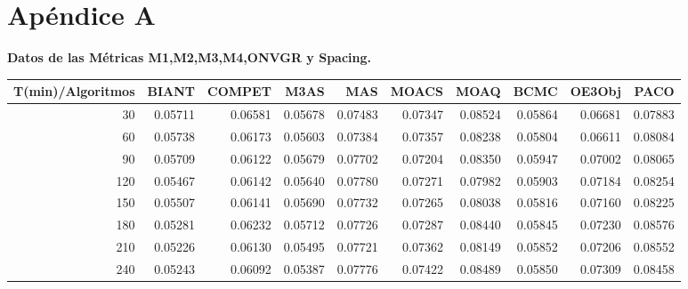 \chapter{Apéndice A}

\textbf{Datos de las M\'etricas M1,M2,M3,M4,ONVGR y Spacing.}
\ifpdf
\graphicspath{{Appendix1/Appendix1Figs/PNG/}{Appendix1/Appendix1Figs/PDF/}{Appendix1/Appendix1Figs/}}
\else
\graphicspath{{Appendix1/Appendix1Figs/EPS/}{Appendix1/Appendix1Figs/}}
\fi

\begin{table}[h]
    \centering
    \begin{tabular}{|r|r|r|r|r|r|r|r|r|r|}
        \hline \tiny T(min)/Algoritmos & \tiny {BIANT} & \tiny {COMPET} & \tiny {M3AS} & \tiny
        {MAS} & \tiny {MOACS} & \tiny {MOAQ} & \tiny {BCMC} & \tiny {OE3Obj} & \tiny {PACO} \\
        \hline \tiny 30 &{\tiny 0.05711 }&{\tiny 0.06581}&{\tiny 0.05678 }&{\tiny 0.07483 }&{\tiny
        0.07347 }&{\tiny 0.08524 }&{\tiny 0.05864}&{\tiny 0.06681} &{\tiny 0.07883} \\
        \hline \tiny 60 &{\tiny 0.05738}&{\tiny 0.06173 }&{\tiny 0.05603}&{\tiny 0.07384 }&{\tiny
        0.07357}&{\tiny 0.08238}&{\tiny 0.05804}&{\tiny 0.06611} &{\tiny 0.08084} \\
        \hline \tiny 90 &{\tiny 0.05709 }&{\tiny 0.06122 }&{\tiny 0.05679}&{\tiny 0.07702}&{\tiny
        0.07204}&{\tiny 0.08350}&{\tiny 0.05947}&{\tiny 0.07002} &{\tiny 0.08065} \\
        \hline \tiny 120 &{\tiny 0.05467}&{\tiny 0.06142}&{\tiny 0.05640}&{\tiny 0.07780}&{\tiny
        0.07271}&{\tiny 0.07982}&{\tiny 0.05903}&{\tiny 0.07184} &{\tiny 0.08254} \\
        \hline \tiny 150 &{\tiny 0.05507}&{\tiny 0.06141}&{\tiny 0.05690}&{\tiny 0.07732}&{\tiny
        0.07265}&{\tiny 0.08038}&{\tiny 0.05816}&{\tiny 0.07160} &{\tiny 0.08225} \\
        \hline \tiny 180 &{\tiny 0.05281}&{\tiny 0.06232}&{\tiny 0.05712}&{\tiny 0.07726}&{\tiny
        0.07287}&{\tiny 0.08440}&{\tiny 0.05845}&{\tiny 0.07230} &{\tiny 0.08576} \\
        \hline \tiny 210 &{\tiny 0.05226}&{\tiny 0.06130}&{\tiny 0.05495}&{\tiny 0.07721}&{\tiny
        0.07362}&{\tiny 0.08149}&{\tiny 0.05852}&{\tiny 0.07206} &{\tiny 0.08552} \\
        \hline \tiny 240 &{\tiny 0.05243}&{\tiny 0.06092}&{\tiny 0.05387}&{\tiny 0.07776}&{\tiny
        0.07422}&{\tiny 0.08489}&{\tiny 0.05850}&{\tiny 0.07309} &{\tiny 0.08458} \\

\end{tabular}
\end{table}
